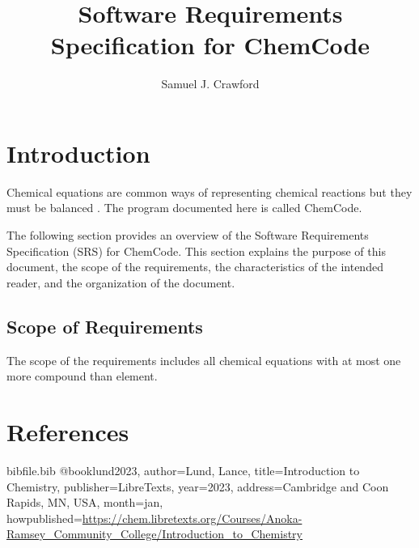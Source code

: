 \documentclass[12pt]{article}
\title{Software Requirements Specification for ChemCode}
\author{Samuel J. Crawford}
\begin{document}
\maketitle
\tableofcontents
\newpage
\section{Introduction}
\label{Sec:Intro}
Chemical equations are common ways of representing chemical reactions but they must be balanced \cite{lund2023}. The program documented here is called ChemCode.

The following section provides an overview of the Software Requirements Specification (SRS) for ChemCode. This section explains the purpose of this document, the scope of the requirements, the characteristics of the intended reader, and the organization of the document.

\subsection{Scope of Requirements}
\label{Sec:ReqsScope}
The scope of the requirements includes all chemical equations with at most one more compound than element.

\section{References}
\label{Sec:References}
\begin{filecontents*}{bibfile.bib}
@book{lund2023,
author={Lund, Lance},
title={Introduction to Chemistry},
publisher={LibreTexts},
year={2023},
address={Cambridge and Coon Rapids, MN, USA},
month=jan,
howpublished={\url{https://chem.libretexts.org/Courses/Anoka-Ramsey\_Community\_College/Introduction\_to\_Chemistry}}}
\end{filecontents*}
\nocite{*}
\printbibliography[heading=none]
\end{document}
